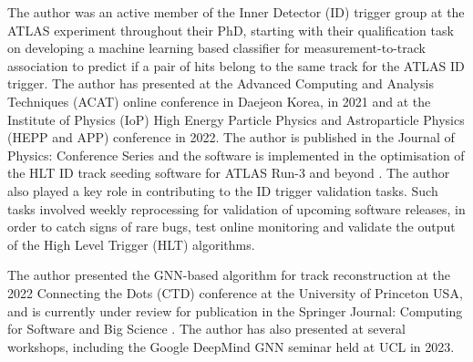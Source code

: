 The author was an active member of the Inner Detector (ID) trigger group at the ATLAS experiment throughout their PhD, starting with their qualification task on developing a machine learning based classifier for measurement-to-track association to predict if a pair of hits belong to the same track for the ATLAS ID trigger. The author has presented at the Advanced Computing and Analysis Techniques (ACAT) online conference in Daejeon Korea, in 2021 and at the Institute of Physics (IoP) High Energy Particle Physics and Astroparticle Physics (HEPP and APP) conference in 2022. The author is published in the Journal of Physics: Conference Series \cite{Lad_2023} and the software is implemented in the optimisation of the HLT ID track seeding software for ATLAS Run-3 and beyond \cite{Grandi:2728111, Long:2813981}. The author also played a key role in contributing to the ID trigger validation tasks. Such tasks involved weekly reprocessing for validation of upcoming software releases, in order to catch signs of rare bugs, test online monitoring and validate the output of the High Level Trigger (HLT) algorithms.

The author presented the GNN-based algorithm for track reconstruction at the 2022 Connecting the Dots (CTD) conference at the University of Princeton USA, and is currently under review for publication in the Springer Journal: Computing for Software and Big Science \cite{Lad_2023_gnn}. The author has also presented at several workshops, including the Google DeepMind GNN seminar held at UCL in 2023.

